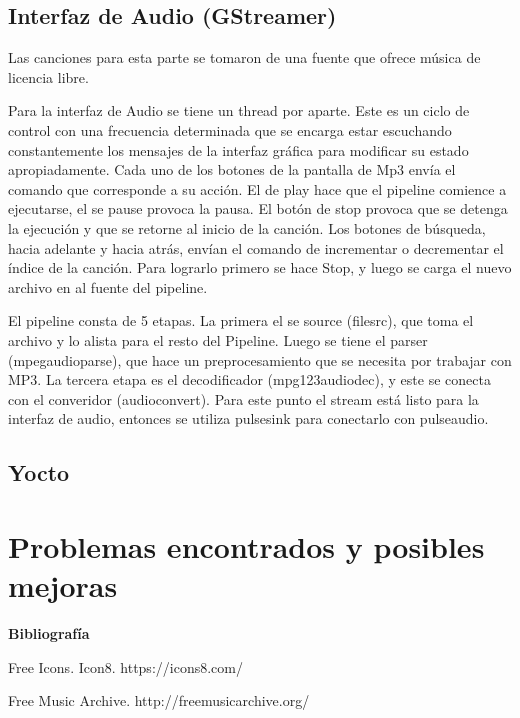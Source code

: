 \subsection{Interfaz de Audio (GStreamer)}
\label{sec:gstramer}
Las canciones para esta parte se tomaron de una fuente que ofrece música de licencia libre. %


Para la interfaz de Audio se tiene un thread por aparte. Este es un ciclo de control con una
frecuencia determinada que se encarga estar escuchando constantemente los mensajes de la interfaz
gráfica para modificar su estado apropiadamente. Cada uno de los botones de la pantalla de Mp3 envía
el comando que corresponde a su acción. El de play hace que el pipeline comience a ejecutarse, el se
pause provoca la pausa. El botón de stop provoca que se detenga la ejecución y que se retorne al
inicio de la canción. Los botones de búsqueda, hacia adelante y hacia atrás, envían el comando de
incrementar o decrementar el índice de la canción. Para lograrlo primero se hace Stop, y luego se
carga el nuevo archivo en al fuente del pipeline. 

El pipeline consta de 5 etapas. La primera el se source (filesrc), que toma el archivo y lo alista
para el resto del Pipeline. Luego se tiene el parser (mpegaudioparse), que hace un preprocesamiento
que se necesita por trabajar con MP3. La tercera etapa es el decodificador (mpg123audiodec), y este
se conecta con el converidor (audioconvert). Para este punto el stream está listo para la interfaz
de audio, entonces se utiliza pulsesink para conectarlo con pulseaudio. 


\subsection{Yocto}
\label{sec:yocto}


\section{Problemas encontrados y posibles mejoras}
\label{sec:possible_fixes}



%


\textbf{ Bibliografía}

Free Icons. Icon8. https://icons8.com/

Free Music Archive. http://freemusicarchive.org/
%
%
